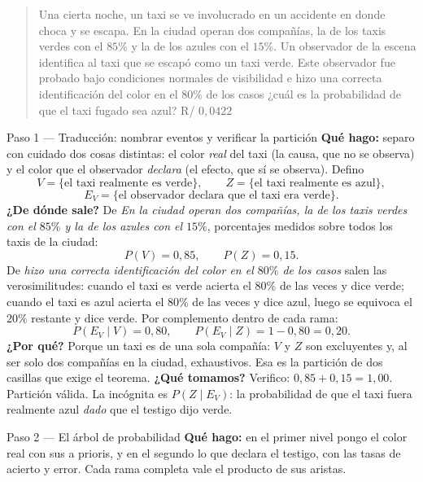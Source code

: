 \documentclass[11pt]{article}
\begin{document}
\begin{quote}
Una cierta noche, un taxi se ve involucrado en un accidente en donde choca y se escapa. En la ciudad operan dos compañías, la de los taxis verdes con el $85\%$ y la de los azules con el $15\%$. Un observador de la escena identifica al taxi que se escapó como un taxi verde. Este observador fue probado bajo condiciones normales de visibilidad e hizo una correcta identificación del color en el $80\%$ de los casos ¿cuál es la probabilidad de que el taxi fugado sea azul? \hfill R/ $0,0422$
\end{quote}

\begin{sol}

\begin{paso}{Paso 1 --- Traducción: nombrar eventos y verificar la partición}
\textbf{Qué hago:} separo con cuidado dos cosas distintas: el color \emph{real} del taxi (la causa, que no se observa) y el color que el observador \emph{declara} (el efecto, que sí se observa). Defino
\[
V=\{\text{el taxi realmente es verde}\},\qquad Z=\{\text{el taxi realmente es azul}\},
\]
\[
E_V=\{\text{el observador declara que el taxi era verde}\}.
\]
\textbf{¿De dónde sale?} De \emph{En la ciudad operan dos compañías, la de los taxis verdes con el $85\%$ y la de los azules con el $15\%$}, porcentajes medidos sobre todos los taxis de la ciudad:
\[
P(V)=0,85,\qquad P(Z)=0,15 .
\]
De \emph{hizo una correcta identificación del color en el $80\%$ de los casos} salen las verosimilitudes: cuando el taxi es verde acierta el $80\%$ de las veces y dice verde; cuando el taxi es azul acierta el $80\%$ de las veces y dice azul, luego se equivoca el $20\%$ restante y dice verde. Por complemento dentro de cada rama:
\[
P(E_V\mid V)=0,80,\qquad P(E_V\mid Z)=1-0,80=0,20 .
\]
\textbf{¿Por qué?} Porque un taxi es de una sola compañía: $V$ y $Z$ son excluyentes y, al ser solo dos compañías en la ciudad, exhaustivos. Esa es la partición de dos casillas que exige el teorema.
\textbf{¿Qué tomamos?} Verifico: $0,85+0,15=1,00$. Partición válida. La incógnita es $P(Z\mid E_V)$: la probabilidad de que el taxi fuera realmente azul \emph{dado} que el testigo dijo verde.
\end{paso}

\begin{paso}{Paso 2 --- El árbol de probabilidad}
\textbf{Qué hago:} en el primer nivel pongo el color real con sus a prioris, y en el segundo lo que declara el testigo, con las tasas de acierto y error. Cada rama completa vale el producto de sus aristas.


\end{paso}
\end{sol}
\end{document}
